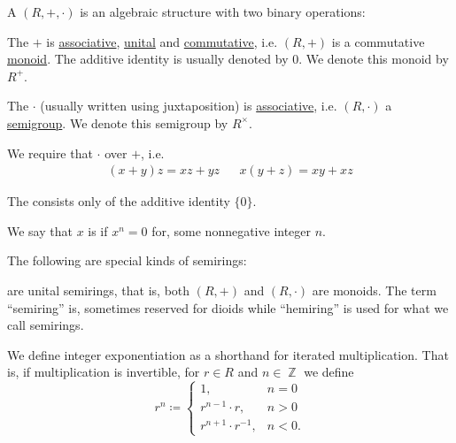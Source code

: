 \begin{definition}\label{def:semiring}
  A  \( (R, +, \cdot) \) is an algebraic structure with two binary operations:
  \begin{thmenum}[series=def:semiring]
     The  \( + \) is \hyperref[def:magma/associative]{associative}, \hyperref[def:unital_magma]{unital} and \hyperref[def:magma/commutative]{commutative}, i.e. \( (R, +) \) is a commutative \hyperref[def:unital_magma/associative]{monoid}. The additive identity is usually denoted by \( 0 \). We denote this monoid by \( R^+ \).

     The  \( \cdot \) (usually written using juxtaposition) is \hyperref[def:magma/associative]{associative}, i.e. \( (R, \cdot) \) a \hyperref[def:magma/associative]{semigroup}. We denote this semigroup by \( R^\times \).

     We require that \( \cdot \)  over \( + \), i.e.
    \begin{align}\label{eq:def:semiring/distributivity}
      (x + y)z = xz + yz
      &&
      x(y + z) = xy + xz
    \end{align}
  \end{thmenum}

  The  consists only of the additive identity \( \{ 0 \} \).

  We say that \( x \) is  if \( x^n = 0 \) for, some nonnegative integer \( n \).

  The following are special kinds of semirings:
  \begin{thmenum}[resume=def:semiring]
      are unital semirings, that is, both \( (R, +) \) and \( (R, \cdot) \) are monoids. The term \enquote{semiring} is, sometimes reserved for dioids while \enquote{hemiring} is used for what we call semirings.

    We define integer exponentiation as a shorthand for iterated multiplication. That is, if multiplication is invertible, for \( r \in R \) and \( n \in \BbbZ \) we define
    \begin{equation*}
      r^n \coloneqq \begin{cases}
        1,                      & n = 0  \\
        r^{n - 1} \cdot r,      & n > 0  \\
        r^{n + 1} \cdot r^{-1}, & n < 0.
      \end{cases}
    \end{equation*}


\end{thmenum}
\end{definition}
